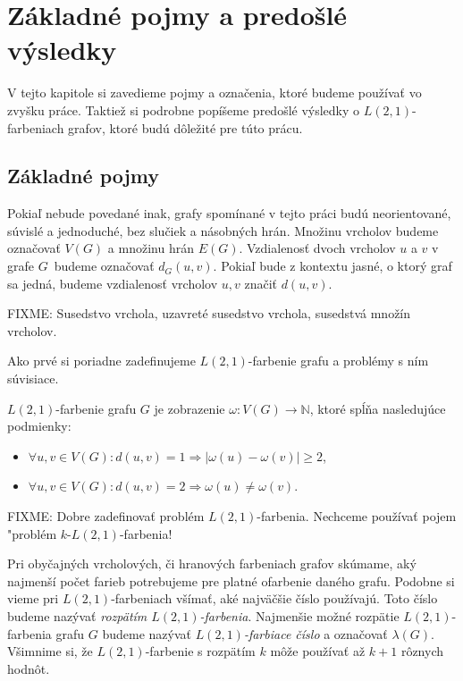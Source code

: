 \chapter{Základné pojmy a predošlé výsledky}

V tejto kapitole si zavedieme pojmy a označenia, ktoré budeme používať
vo zvyšku práce. Taktiež si podrobne popíšeme predošlé výsledky o
$L(2,1)$-farbeniach grafov, ktoré budú dôležité pre túto prácu.

\section{Základné pojmy}

Pokiaľ nebude povedané inak, grafy spomínané v tejto práci budú neorientované,
súvislé a jednoduché, bez slučiek a násobných hrán. Množinu vrcholov budeme
označovať $V(G)$ a množinu hrán $E(G)$. Vzdialenosť dvoch vrcholov $u$ a $v$
v grafe $G$ budeme označovať $d_G(u,v)$. Pokiaľ bude z kontextu jasné, o
ktorý graf sa jedná, budeme vzdialenosť vrcholov $u, v$ značiť $d(u,v)$.

FIXME: Susedstvo vrchola, uzavreté susedstvo vrchola, susedstvá množín vrcholov.

Ako prvé si poriadne
zadefinujeme $L(2,1)$-farbenie grafu a problémy s ním súvisiace.

\begin{defn}
    $L(2,1)$-farbenie grafu $G$ je zobrazenie $\omega : V(G) \to \mathbb{N}$,
    ktoré spĺňa nasledujúce podmienky:

    \begin{itemize}
        \item $\forall u, v \in V(G): d(u, v) = 1 \Rightarrow \left| \omega(u) - \omega(v) \right| \ge 2$,
        \item $\forall u, v \in V(G): d(u, v) = 2 \Rightarrow \omega(u) \neq \omega(v)$.
    \end{itemize}
\end{defn}

FIXME: Dobre zadefinovať problém $L(2,1)$-farbenia. Nechceme používať pojem
"problém $k$-$L(2,1)$-farbenia!

Pri obyčajných vrcholových, či hranových farbeniach grafov skúmame, aký
najmenší počet farieb potrebujeme pre platné ofarbenie daného grafu. Podobne
si vieme pri $L(2,1)$-farbeniach všímať, aké najväčšie číslo používajú. Toto
číslo budeme nazývať \emph{rozpätím $L(2,1)$-farbenia}. Najmenšie možné rozpätie
$L(2,1)$-farbenia grafu $G$ budeme nazývať \emph{$L(2,1)$-farbiace číslo} a
označovať $\lambda(G)$. Všimnime si, že $L(2,1)$-farbenie s
rozpätím $k$ môže používať až $k+1$ rôznych hodnôt.

